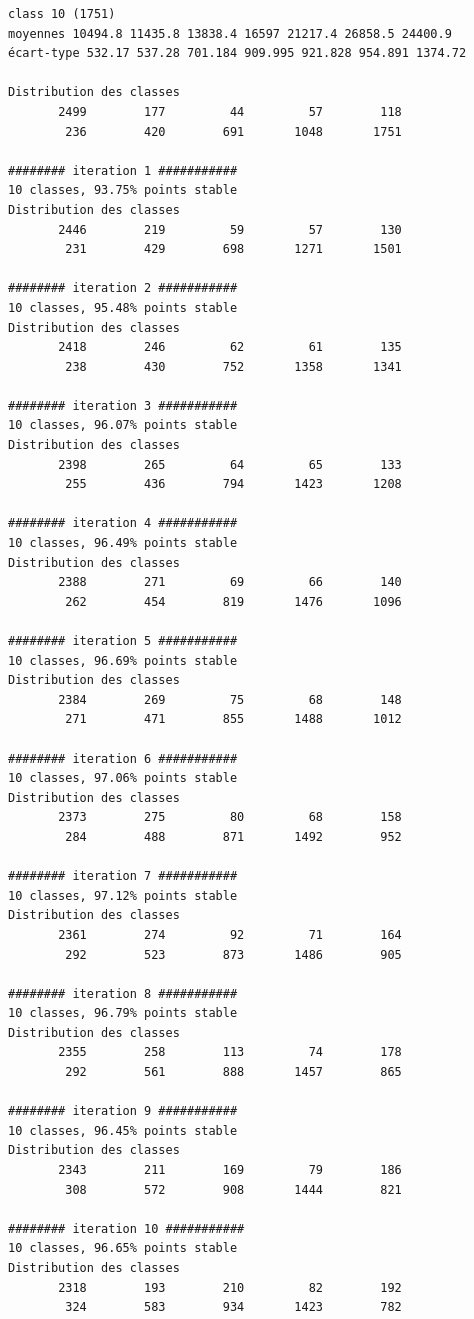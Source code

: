 \documentclass[earth,article,accept,pdftex,moreauthors]{Definitions/mdpi}
\begin{document}
{\begin{scriptsize}
\begin{verbatim}
class 10 (1751)
moyennes 10494.8 11435.8 13838.4 16597 21217.4 26858.5 24400.9
écart-type 532.17 537.28 701.184 909.995 921.828 954.891 1374.72

Distribution des classes
       2499        177         44         57        118
        236        420        691       1048       1751

######## iteration 1 ###########
10 classes, 93.75% points stable
Distribution des classes
       2446        219         59         57        130
        231        429        698       1271       1501

######## iteration 2 ###########
10 classes, 95.48% points stable
Distribution des classes
       2418        246         62         61        135
        238        430        752       1358       1341

######## iteration 3 ###########
10 classes, 96.07% points stable
Distribution des classes
       2398        265         64         65        133
        255        436        794       1423       1208

######## iteration 4 ###########
10 classes, 96.49% points stable
Distribution des classes
       2388        271         69         66        140
        262        454        819       1476       1096

######## iteration 5 ###########
10 classes, 96.69% points stable
Distribution des classes
       2384        269         75         68        148
        271        471        855       1488       1012

######## iteration 6 ###########
10 classes, 97.06% points stable
Distribution des classes
       2373        275         80         68        158
        284        488        871       1492        952

######## iteration 7 ###########
10 classes, 97.12% points stable
Distribution des classes
       2361        274         92         71        164
        292        523        873       1486        905

######## iteration 8 ###########
10 classes, 96.79% points stable
Distribution des classes
       2355        258        113         74        178
        292        561        888       1457        865

######## iteration 9 ###########
10 classes, 96.45% points stable
Distribution des classes
       2343        211        169         79        186
        308        572        908       1444        821

######## iteration 10 ###########
10 classes, 96.65% points stable
Distribution des classes
       2318        193        210         82        192
        324        583        934       1423        782


\end{verbatim}
\end{scriptsize}}
\end{document}
